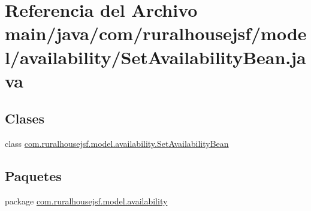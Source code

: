 \hypertarget{a00077}{}\section{Referencia del Archivo main/java/com/ruralhousejsf/model/availability/\+Set\+Availability\+Bean.java}
\label{a00077}
\subsection*{Clases}
\begin{DoxyCompactItemize}
\item 
class \mbox{\hyperlink{a00228}{com.\+ruralhousejsf.\+model.\+availability.\+Set\+Availability\+Bean}}
\end{DoxyCompactItemize}
\subsection*{Paquetes}
\begin{DoxyCompactItemize}
\item 
package \mbox{\hyperlink{a00120}{com.\+ruralhousejsf.\+model.\+availability}}
\end{DoxyCompactItemize}
